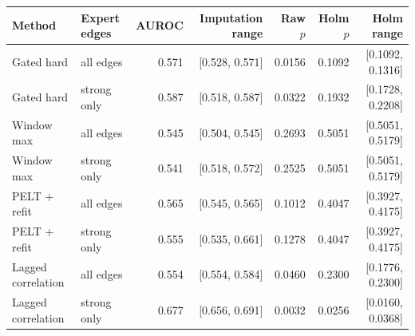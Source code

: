 \begin{tabular}{llrrrrr}
\toprule
Method & Expert edges & AUROC & Imputation range & Raw $p$ & Holm $p$ & Holm range \\
\midrule
Gated hard & all edges & 0.571 & [0.528, 0.571] & 0.0156 & 0.1092 & [0.1092, 0.1316] \\
Gated hard & strong only & 0.587 & [0.518, 0.587] & 0.0322 & 0.1932 & [0.1728, 0.2208] \\
Window max & all edges & 0.545 & [0.504, 0.545] & 0.2693 & 0.5051 & [0.5051, 0.5179] \\
Window max & strong only & 0.541 & [0.518, 0.572] & 0.2525 & 0.5051 & [0.5051, 0.5179] \\
PELT + refit & all edges & 0.565 & [0.545, 0.565] & 0.1012 & 0.4047 & [0.3927, 0.4175] \\
PELT + refit & strong only & 0.555 & [0.535, 0.661] & 0.1278 & 0.4047 & [0.3927, 0.4175] \\
Lagged correlation & all edges & 0.554 & [0.554, 0.584] & 0.0460 & 0.2300 & [0.1776, 0.2300] \\
Lagged correlation & strong only & 0.677 & [0.656, 0.691] & 0.0032 & 0.0256 & [0.0160, 0.0368] \\
\bottomrule
\end{tabular}

